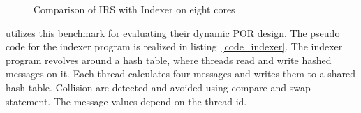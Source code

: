 \begin{figure}[h]
     \centering
     \caption{Comparison of IRS with Indexer on eight cores}
\end{figure}

\citet{dynamic_por} utilizes this benchmark for evaluating their dynamic POR design. 
The pseudo code for the indexer program is realized in listing~\ref{code_indexer}.  
The indexer program revolves around a hash table, where threads read and write hashed messages on it. 
Each thread calculates four messages and writes them to a shared hash table. 
Collision are detected and avoided using compare and swap statement. 
The message values depend on the thread id. 

